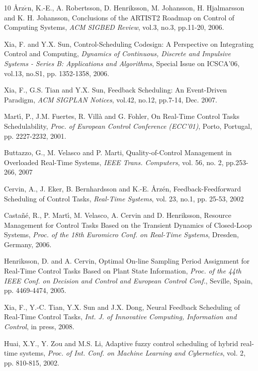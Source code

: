 \documentclass[12pt,a4paper]{ijicic}
\begin{document}
\begin {thebibliography}{10}
{\AA}rz$\acute{e}$n, K.-E., A. Robertsson, D. Henriksson, M.
Johansson, H. Hjalmarsson and K. H. Johansson, Conclusions of the
ARTIST2 Roadmap on Control of Computing Systems, \emph{ACM SIGBED
Review}, vol.3, no.3, pp.11-20, 2006.

Xia, F. and Y.X. Sun, Control-Scheduling Codesign: A Perspective on
Integrating Control and Computing, \emph{Dynamics of Continuous,
Discrete and Impulsive Systems - Series B: Applications and
Algorithms}, Special Issue on ICSCA'06, vol.13, no.S1, pp.
1352-1358, 2006.

Xia, F., G.S. Tian and Y.X. Sun, Feedback Scheduling: An
Event-Driven Paradigm, \emph{ACM SIGPLAN Notices}, vol.42, no.12,
pp.7-14, Dec. 2007.

Mart\'{\i}, P., J.M. Fuertes, R. Vill\`{a} and G. Fohler, On
Real-Time Control Tasks Schedulability, \emph{Proc. of European
Control Conference (ECC'01)}, Porto, Portugal, pp. 2227-2232, 2001.

Buttazzo, G., M. Velasco and P. Marti, Quality-of-Control Management
in Overloaded Real-Time Systems, \emph{IEEE Trans. Computers}, vol.
56, no. 2, pp.253-266, 2007

Cervin, A., J. Eker, B. Bernhardsson and K.-E. {\AA}rz\'{e}n,
Feedback-Feedforward Scheduling of Control Tasks, \emph{Real-Time
Systems}, vol. 23, no.1, pp. 25-53, 2002

Casta\~{n}\'{e}, R., P. Mart\'{\i}, M. Velasco, A. Cervin and D.
Henriksson, Resource Management for Control Tasks Based on the
Transient Dynamics of Closed-Loop Systems, \emph{Proc. of the 18th
Euromicro Conf. on Real-Time Systems}, Dresden, Germany, 2006.

Henriksson, D. and A. Cervin, Optimal On-line Sampling Period
Assignment for Real-Time Control Tasks Based on Plant State
Information, \emph{Proc. of the 44th IEEE Conf. on Decision and
Control and European Control Conf.}, Seville, Spain, pp. 4469-4474,
2005.

Xia, F., Y.-C. Tian, Y.X. Sun and J.X. Dong, Neural Feedback
Scheduling of Real-Time Control Tasks, \emph{Int. J. of Innovative
Computing, Information and Control}, in press, 2008.

Huai, X.Y., Y. Zou and M.S. Li, Adaptive fuzzy control scheduling of
hybrid real-time systems, \emph{Proc. of Int. Conf. on Machine
Learning and Cybernetics}, vol. 2, pp. 810-815, 2002.


\end{thebibliography}
\end{document}
